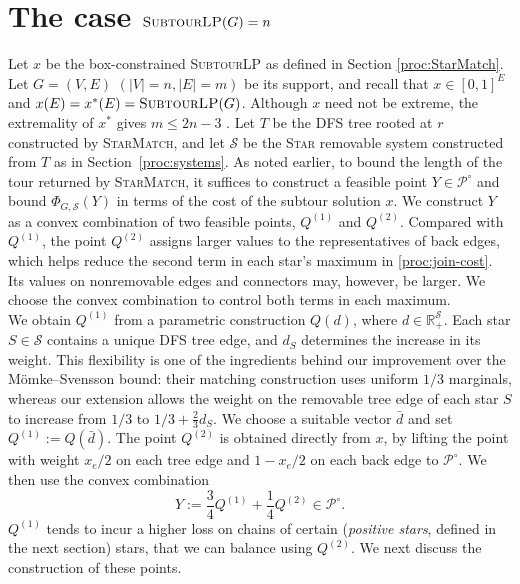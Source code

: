 \documentclass[11pt]{amsart}
\newcommand{\1}{\mathbbm{1}}
\newcommand{\ALG}{\textsc{StarMatch}}
\newcommand{\SubtourLP}{\textsc{SubtourLP}}
\begin{document}
\section{The case \texorpdfstring{${\text{\SubtourLP}(G)}=n$}{SubtourLP(G)=n}}
\label{proc:value-n}
 

{Let $x$ be the box-constrained \SubtourLP{} as defined in {Section \ref{proc:StarMatch}}}. Let $G=(V,E)$ 
$(|V|=n, |E|=m)$ be its support, and recall that $x \in [0,1]^{E}$ and $x(E)=x^*(E)=\text{\SubtourLP}(G)$. Although $x$ need not be extreme, the extremality of $x^*$
gives $m\le2n-3$ \cite{CornuejolsFonluptNaddef}. Let $T$ be the DFS tree rooted at $r$ constructed by \ALG{},
and let $\mathcal S$ be the \textsc{Star} removable system
constructed from $T$ as in Section~\ref{proc:systems}.
{As noted earlier, to bound the length of the tour returned by
\ALG{}, it suffices to construct a feasible point
$Y\in\mathcal P^\circ$ and bound $\Phi_{G,\mathcal S}(Y)$ in terms
of the cost of the subtour solution $x$. We construct $Y$ as a convex combination of two feasible
points, $Q^{(1)}$ and $Q^{(2)}$. Compared with $Q^{(1)}$,
the point $Q^{(2)}$ assigns larger values to the
representatives of back edges, which helps reduce the
second term in each star's maximum in
\eqref{proc:join-cost}. Its values on nonremovable edges
and connectors may, however, be larger. We choose the
convex combination to control both terms in each maximum. \\
We obtain $Q^{(1)}$ from a parametric construction $Q(d)$,
where $d\in\mathbb R_+^{\mathcal S}$. Each star
$S\in\mathcal S$ contains a unique DFS tree edge, and $d_S$
determines the increase in its weight. This flexibility is
one of the ingredients behind our improvement over the
M\"omke--Svensson bound: their matching construction uses
uniform $1/3$ marginals, {whereas our extension allows the weight on the removable tree
edge of each star $S$ to increase from $1/3$ to
$1/3+\frac23d_S$}. We choose a suitable
vector $\bar d$ and set $Q^{(1)}:=Q(\bar d)$.
The point $Q^{(2)}$ is obtained directly from $x$, by lifting the point with weight
$x_e/2$ on each tree edge and $1-x_e/2$ on each back edge to $\mathcal{P}^\circ$.
We then use the convex combination
\[
    Y:=\frac34 Q^{(1)}+\frac14 Q^{(2)}
    \in\mathcal P^\circ.
\]} 
{$Q^{(1)}$ tends to incur a higher loss on chains of certain ({\it positive stars}, defined in the next section) stars, that we can balance using $Q^{(2)}$.} We next discuss the construction of these points.
\end{document}
